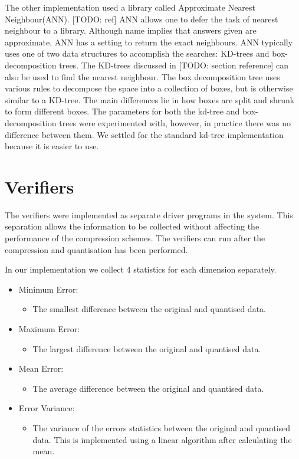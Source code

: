 \documentclass[a4paper,11pt]{report}
\begin{document}
The other implementation used a library called Approximate Nearest Neighbour(ANN). [TODO: ref] ANN allows one to defer the task of nearest neighbour to a library. Although name implies that answers given are approximate, ANN has a setting to return the exact neighbours. ANN typically uses one of two data structures to accomplish the searches: KD-trees and box-decomposition trees. The KD-trees discussed in [TODO: section reference] can also be used to find the nearest neighbour. The box decomposition tree uses various rules to decompose the space into a collection of boxes, but is otherwise similar to a KD-tree. The main differences lie in how boxes are split and shrunk to form different boxes. The parameters for both the kd-tree and box-decomposition trees were experimented with, however, in practice there was no difference between them. We settled for the standard kd-tree implementation because it is easier to use.

\section{Verifiers}

The verifiers were implemented as separate driver programs in the system. This separation allows the information to be collected without affecting the performance of the compression schemes. The verifiers can run after the compression and quantisation has been performed.

In our implementation we collect 4 statistics for each dimension separately.
\begin{itemize}
 \item Minimum Error: 
 \begin{itemize}
   \item The smallest difference between the original and quantised data.
 \end{itemize}
 \item Maximum Error:
 \begin{itemize}
   \item The largest difference between the original and quantised data.
 \end{itemize}
 \item Mean Error:
 \begin{itemize}
   \item The average difference between the original and quantised data.
 \end{itemize}
 \item Error Variance:
 \begin{itemize}
   \item The variance of the errors statistics between the original and quantised data. This is implemented using a linear algorithm after calculating the mean.
 \end{itemize}
\end{itemize}
\end{document}
